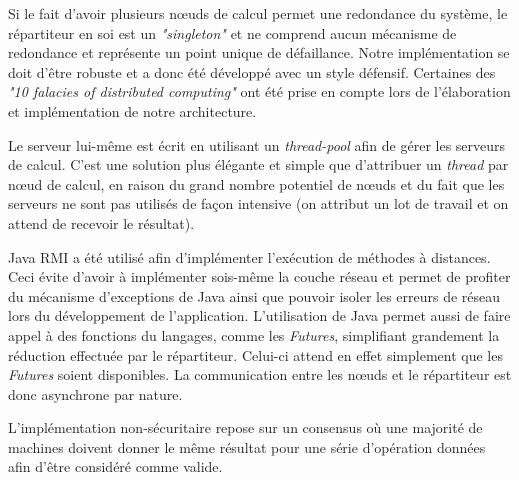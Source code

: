 Si le fait d'avoir plusieurs nœuds de calcul permet une redondance du système, le répartiteur en soi est un \emph{"singleton"} et 
ne comprend aucun mécanisme de redondance et représente un point unique de défaillance. Notre implémentation se doit d'être robuste et 
a donc été développé avec un style défensif. Certaines des \emph{"10 falacies of distributed computing"} ont été prise en compte lors de l'élaboration et implémentation
de notre architecture. 

Le serveur lui-même est écrit en utilisant un \emph{thread-pool} afin de gérer les serveurs de calcul. C'est une solution plus élégante et simple que 
d'attribuer un \emph{thread} par nœud de calcul, en raison du grand nombre potentiel de nœuds et du fait que les serveurs ne sont pas utilisés de façon intensive 
(on attribut un lot de travail et on attend de recevoir le résultat). 

Java RMI a été utilisé afin d'implémenter l'exécution de méthodes à distances. Ceci évite d'avoir à implémenter sois-même la couche réseau et permet
de profiter du mécanisme d'exceptions de Java ainsi que pouvoir isoler les erreurs de réseau lors du développement de l'application. L'utilisation 
de Java permet aussi de faire appel à des fonctions du langages, comme les \emph{Futures}, simplifiant grandement la réduction effectuée par le répartiteur. Celui-ci
attend en effet simplement que les \emph{Futures} soient disponibles. La communication entre les nœuds et le répartiteur est donc asynchrone par nature.  

L'implémentation non-sécuritaire repose sur un consensus où une majorité de machines doivent donner le même résultat pour une série d'opération données 
afin d'être considéré comme valide. 

